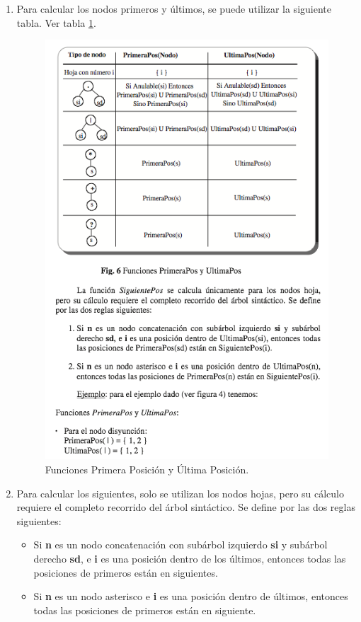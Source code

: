 \documentclass{report}
\begin{document}
\begin{enumerate}
	\item Para calcular los nodos primeros y últimos, se puede utilizar la siguiente tabla. Ver tabla \ref{fig:primeros y ultimos}.

	\begin{figure}
		\centering
		\includegraphics[scale=0.5]{img/tabla2.png}
		\caption{Funciones Primera Posición y Última Posición.}
		\label{fig:primeros y ultimos}
	\end{figure}

	\item Para calcular los siguientes, solo se utilizan los nodos hojas, pero su cálculo requiere el completo recorrido del árbol sintáctico. Se define por las dos reglas siguientes:

	\begin{itemize}
		\item Si {\bf n} es un nodo concatenación con subárbol izquierdo {\bf si} y subárbol derecho {\bf sd}, e {\bf i} es una posición dentro de los últimos, entonces todas las posiciones de primeros están en siguientes.
		\item Si  {\bf n} es un nodo asterisco e {\bf i} es una posición dentro de últimos, entonces todas las posiciones de primeros están en siguiente.
	\end{itemize}


\end{enumerate}
\end{document}
